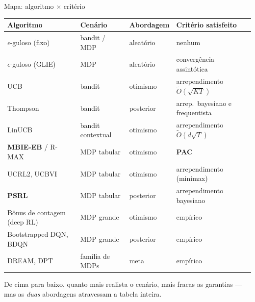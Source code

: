 \documentclass[aspectratio=169, 11pt]{beamer}
\begin{document}
\begin{frame}{Mapa: algoritmo $\times$ critério}
  \centering\small
  \begin{tabular}{@{}l l l l@{}}
    \toprule
    \textbf{Algoritmo} & \textbf{Cenário} & \textbf{Abordagem} & \textbf{Critério satisfeito} \\
    \midrule
    $\epsilon$-guloso (fixo)      & bandit / MDP      & aleatório & nenhum \\
    $\epsilon$-guloso (GLIE)      & MDP               & aleatório & convergência assintótica \\
    UCB                           & bandit            & otimismo  & arrependimento $\tilde{O}(\sqrt{KT})$ \\
    Thompson                      & bandit            & posterior & arrep.\ bayesiano e frequentista \\
    LinUCB                        & bandit contextual & otimismo  & arrependimento $\tilde{O}(d\sqrt{T})$ \\
    \textbf{MBIE-EB} / R-MAX      & MDP tabular       & otimismo  & \textbf{PAC} \\
    UCRL2, UCBVI                  & MDP tabular       & otimismo  & arrependimento (minimax) \\
    \textbf{PSRL}                 & MDP tabular       & posterior & arrependimento bayesiano \\
    Bônus de contagem (deep RL)   & MDP grande        & otimismo  & empírico \\
    Bootstrapped DQN, BDQN        & MDP grande        & posterior & empírico \\
    DREAM, DPT                    & família de MDPs   & meta      & empírico \\
    \bottomrule
  \end{tabular}
  \vspace{0.4em}
  {\small\color{rlCinza} De cima para baixo, quanto mais realista o cenário, mais
  fracas as garantias --- mas as \emph{duas} abordagens atravessam a tabela inteira.}
\end{frame}
\end{document}
